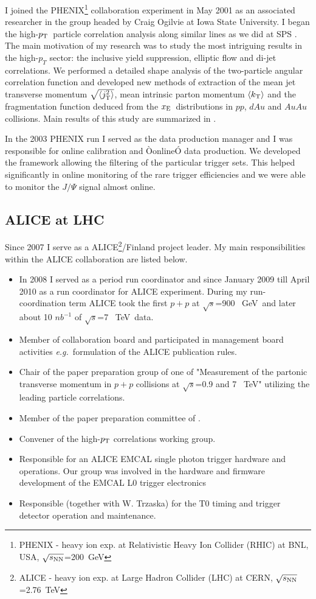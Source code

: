 \documentclass[12pt]{article}
\def\la{\left< }
\def\ra{\right> }
\def\mean#1{\ensuremath{\la#1\ra}}
\def\meankv#1{\ensuremath{\la#1^2\ra}}
\def\sqrtrms#1{\ensuremath{\sqrt{\meankv{#1}}}}
\newcommand{\s} {\ensuremath{\sqrt{s}}}
\def\tev{\mbox{~TeV}}
\def\gev{\mbox{~GeV}}
\def\eg{{\it e.g.}}
\def\pt#1{\ensuremath{p_{\rm T#1}}}
\def\kt#1{\ensuremath{k_{\rm T#1}}}
\def\jt#1{\ensuremath{j_{\rm T#1}}}
\newcommand{\xe} {\ensuremath{x_{\rm E}}}
\begin{document}
I joined the PHENIX\footnote{PHENIX - heavy ion exp. at Relativistic Heavy Ion Collider (RHIC) at BNL, USA, $\sqrt{s_{\rm NN}}$=200~GeV} collaboration  experiment  in May 2001 as an associated researcher in the group headed by Craig Ogilvie at Iowa State University. I began the high-\pt{}\  particle correlation analysis along similar lines as we did at SPS \cite{Agakichiev:2003gg}.  The main motivation of my research was to study the most intriguing results in the high-$p_T$ sector: the inclusive yield suppression, elliptic flow and di-jet correlations.  We performed a detailed shape analysis of the two-particle angular correlation function and developed new methods of extraction of the mean jet transverse momentum \sqrtrms{\jt{}}, mean intrinsic parton momentum \mean{\kt{}} and the fragmentation function deduced from the \xe\ distributions in $pp$, $dAu$ and $AuAu$ collisions. Main results of this study are summarized in \cite{Adler:2006sc}.

In the 2003 PHENIX run I served as the data production manager and I was responsible for online calibration and ÒonlineÓ data production.  We developed the framework allowing the filtering of the particular trigger sets. This helped significantly in online monitoring of the rare trigger efficiencies and we were able to monitor the $J/\Psi$ signal almost online. 

\subsection{ALICE at LHC}
Since 2007 I serve as a ALICE\footnote{ALICE - heavy ion exp. at Large Hadron Collider (LHC) at CERN, $\sqrt{s_{\rm NN}}$=2.76~TeV}/Finland
  project leader. My main responsibilities within the ALICE collaboration are listed below. 

\begin{itemize}
\item In 2008 I served as a period run coordinator and since January 2009 till April 2010  as a run coordinator for ALICE experiment. During my run-coordination term ALICE took the first $p+p$ at \s=900 \gev\ and later about 10 $nb^{-1}$ of \s=7 \tev\ data.
\item Member of collaboration board and participated in management board activities \eg\ formulation of the ALICE publication rules.
\item Chair of the paper preparation group of one of  "Measurement of the partonic transverse momentum in $p+p$ collisions at \s=0.9 and 7 \tev" utilizing the leading particle correlations. 
\item Member of the paper preparation committee of \cite{Aamodt2012}.
\item Convener of the high-\pt{} correlations working group.
\item Responsible for an ALICE EMCAL single photon trigger hardware and operations. Our group was involved in the hardware and firmware development of the EMCAL L0 trigger electronics \cite{JiriKral2012}
\item Responsible (together with W. Trzaska) for the T0 timing and trigger detector operation and maintenance.
\end{itemize}
\end{document}
